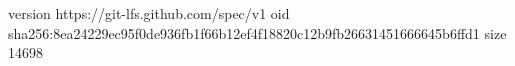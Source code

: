 version https://git-lfs.github.com/spec/v1
oid sha256:8ea24229ec95f0de936fb1f66b12ef4f18820c12b9fb26631451666645b6ffd1
size 14698
